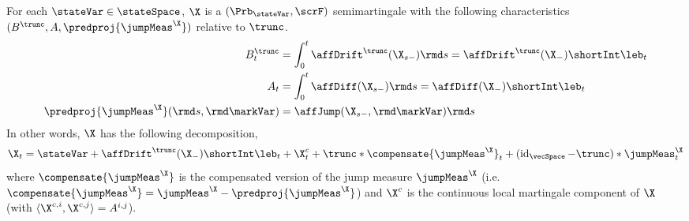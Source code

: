 \begin{theorem}
  \label{theorem:semimartingale}
  For each $\stateVar \in \stateSpace$, $\X$ is a $(\Prb_\stateVar, \scrF)$ semimartingale with the following characteristics $(B^\trunc, A, \predproj{\jumpMeas^\X})$ relative to $\trunc$.
  \begin{align}
    B^\trunc_t 
    &= \int_0^t \affDrift^\trunc(\X_{s-}) \rmd s  
    = \affDrift^\trunc(\X_-) \shortInt \leb_t \\
    A_t 
    &=\int_0^t \affDiff(\X_{s-}) \rmd s 
    = \affDiff(\X_-) \shortInt \leb_t \\
    \predproj{\jumpMeas^\X}(\rmd s, \rmd\markVar) 
    &= \affJump(\X_{s-}, \rmd\markVar) \rmd s
  \end{align}
  In other words, $\X$ has the following decomposition,
  \begin{equation}
    \label{eq:semimartingale-decomposition}
    \X_t = \stateVar + \affDrift^\trunc(\X_-) \shortInt \leb_t + \X^c_t + \trunc \ast \compensate{\jumpMeas^\X}_t + (\operatorname{id}_\vecSpace-\trunc)\ast\jumpMeas^\X_t
  \end{equation}
  where $\compensate{\jumpMeas^\X}$ is the compensated version of the jump measure $\jumpMeas^\X$ (i.e.\, $\compensate{\jumpMeas^\X} = \jumpMeas^\X - \predproj{\jumpMeas^\X}$) and $\X^c$ is the continuous local martingale component of $\X$ (with $\langle\X^{c,i}, \X^{c,j}\rangle = A^{i,j}$).
\end{theorem}
